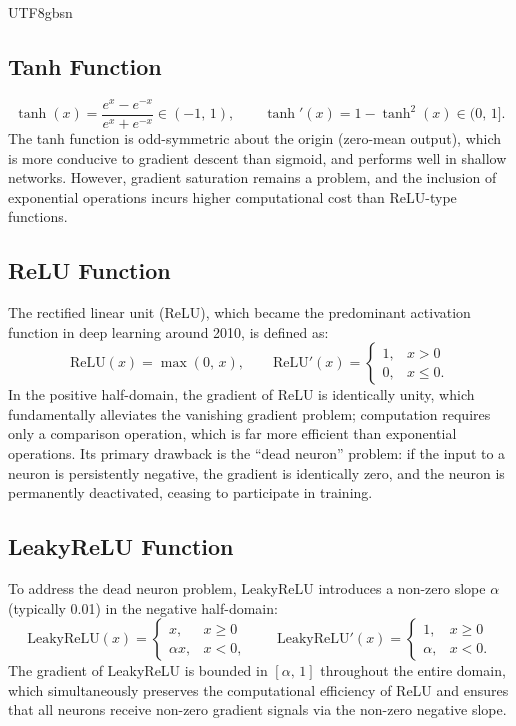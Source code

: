 \documentclass[a4paper,12pt]{report}
\begin{document}
\begin{CJK}{UTF8}{gbsn}
\subsection{Tanh Function}
\label{subsec:tanh}

\begin{equation}
  \tanh(x) = \frac{e^x - e^{-x}}{e^x + e^{-x}} \in (-1,\,1), \qquad
  \tanh'(x) = 1 - \tanh^2(x) \in (0,\,1].
  \label{eq:tanh}
\end{equation}
The tanh function is odd-symmetric about the origin (zero-mean output), which is more
conducive to gradient descent than sigmoid, and performs well in shallow networks.
However, gradient saturation remains a problem, and the inclusion of exponential
operations incurs higher computational cost than ReLU-type functions.

\subsection{ReLU Function}
\label{subsec:relu}

The rectified linear unit (ReLU), which became the predominant activation function in
deep learning around 2010, is defined as:
\begin{equation}
  \mathrm{ReLU}(x) = \max(0,\,x), \qquad
  \mathrm{ReLU}'(x) =
  \begin{cases} 1, & x > 0 \\ 0, & x \leq 0. \end{cases}
  \label{eq:relu}
\end{equation}
In the positive half-domain, the gradient of ReLU is identically unity, which
fundamentally alleviates the vanishing gradient problem; computation requires only a
comparison operation, which is far more efficient than exponential operations. Its primary
drawback is the ``dead neuron'' problem: if the input to a neuron is persistently negative,
the gradient is identically zero, and the neuron is permanently deactivated, ceasing to
participate in training.

\subsection{LeakyReLU Function}
\label{subsec:leakyrelu}

To address the dead neuron problem, LeakyReLU introduces a non-zero slope $\alpha$
(typically 0.01) in the negative half-domain:
\begin{equation}
  \mathrm{LeakyReLU}(x) =
  \begin{cases} x, & x \geq 0 \\ \alpha x, & x < 0, \end{cases} \qquad
  \mathrm{LeakyReLU}'(x) =
  \begin{cases} 1, & x \geq 0 \\ \alpha, & x < 0.
  \end{cases}
  \label{eq:leakyrelu}
\end{equation}
The gradient of LeakyReLU is bounded in $[\alpha,\,1]$ throughout the entire domain, which
simultaneously preserves the computational efficiency of ReLU and ensures that all neurons
receive non-zero gradient signals via the non-zero negative slope.


\end{CJK}
\end{document}
